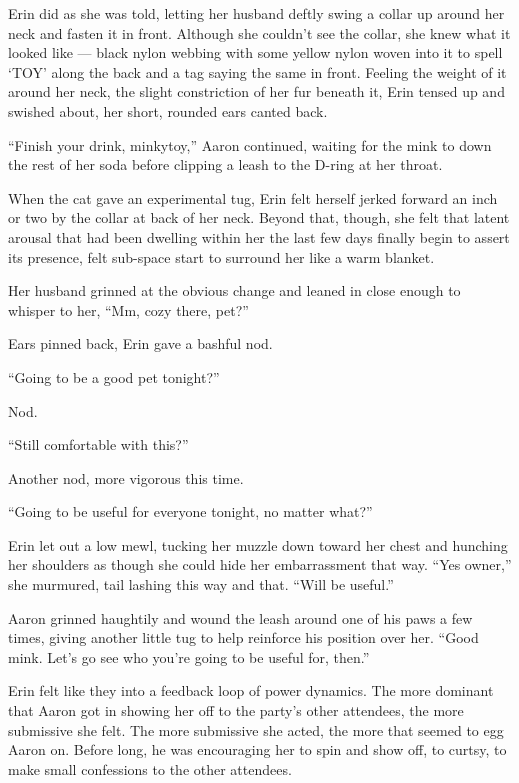 Erin did as she was told, letting her husband deftly swing a collar up around her neck and fasten it in front. Although she couldn't see the collar, she knew what it looked like --- black nylon webbing with some yellow nylon woven into it to spell `TOY' along the back and a tag saying the same in front. Feeling the weight of it around her neck, the slight constriction of her fur beneath it, Erin tensed up and swished about, her short, rounded ears canted back.

``Finish your drink, minkytoy,'' Aaron continued, waiting for the mink to down the rest of her soda before clipping a leash to the D-ring at her throat.

When the cat gave an experimental tug, Erin felt herself jerked forward an inch or two by the collar at back of her neck. Beyond that, though, she felt that latent arousal that had been dwelling within her the last few days finally begin to assert its presence, felt sub-space start to surround her like a warm blanket.

Her husband grinned at the obvious change and leaned in close enough to whisper to her, ``Mm, cozy there, pet?''

Ears pinned back, Erin gave a bashful nod.

``Going to be a good pet tonight?''

Nod.

``Still comfortable with this?''

Another nod, more vigorous this time.

``Going to be useful for everyone tonight, no matter what?''

Erin let out a low mewl, tucking her muzzle down toward her chest and hunching her shoulders as though she could hide her embarrassment that way. ``Yes owner,'' she murmured, tail lashing this way and that. ``Will be useful.''

Aaron grinned haughtily and wound the leash around one of his paws a few times, giving another little tug to help reinforce his position over her. ``Good mink. Let's go see who you're going to be useful for, then.''

Erin felt like they into a feedback loop of power dynamics. The more dominant that Aaron got in showing her off to the party's other attendees, the more submissive she felt. The more submissive she acted, the more that seemed to egg Aaron on. Before long, he was encouraging her to spin and show off, to curtsy, to make small confessions to the other attendees.

